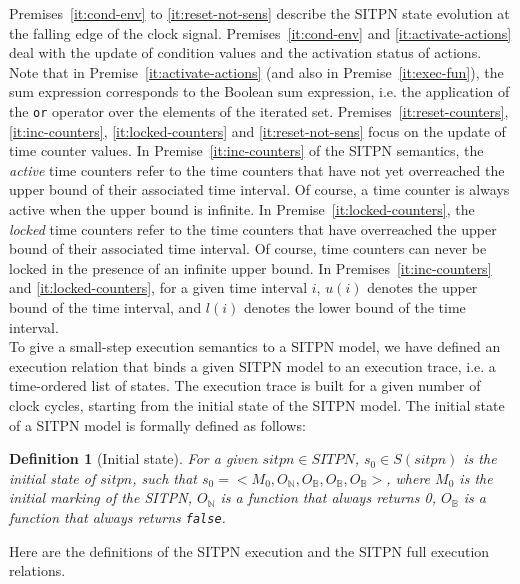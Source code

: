 \documentclass[pdflatex,sn-mathphys]{sn-jnl}%
\theoremstyle{thmstyleone}%
\theoremstyle{thmstyletwo}%
\theoremstyle{thmstylethree}%
\newtheorem{definition}{Definition}%
\begin{document}
Premises~\ref{it:cond-env} to \ref{it:reset-not-sens} describe the
SITPN state evolution at the falling edge of the clock
signal. Premises~\ref{it:cond-env} and \ref{it:activate-actions} deal
with the update of condition values and the activation status of
actions. Note that in Premise~\ref{it:activate-actions} (and also in
Premise~\ref{it:exec-fun}), the sum expression corresponds to the
Boolean sum expression, i.e. the application of the \texttt{or}
operator over the elements of the iterated
set. Premises~\ref{it:reset-counters}, \ref{it:inc-counters},
\ref{it:locked-counters} and \ref{it:reset-not-sens} focus on the
update of time counter values.  In Premise~\ref{it:inc-counters} of
the SITPN semantics, the \emph{active} time counters refer to the time
counters that have not yet overreached the upper bound of their
associated time interval. Of course, a time counter is always active
when the upper bound is infinite. In Premise~\ref{it:locked-counters},
the \emph{locked} time counters refer to the time counters that have
overreached the upper bound of their associated time interval. Of
course, time counters can never be locked in the presence of an
infinite upper bound. In Premises~\ref{it:inc-counters} and
\ref{it:locked-counters}, for a given time interval $i$, $u(i)$
denotes the upper bound of the time interval, and $l(i)$ denotes the
lower bound of the time interval.\\

To give a small-step execution semantics to a SITPN model, we have
defined an execution relation that binds a given SITPN model to an
execution trace, i.e. a time-ordered list of states. The execution
trace is built for a given number of clock cycles, starting from the
initial state of the SITPN model.  The initial state of a SITPN model
is formally defined as follows:

\begin{definition}[Initial state]
  \label{def:sitpn-init-state}
  For a given $sitpn\in{}SITPN$, $s_0\in{}S(sitpn)$ is the initial
  state of $sitpn$, such that
  $s_0=<M_0,O_\mathbb{N},O_\mathbb{B},O_\mathbb{B},O_\mathbb{B}>$,
  where $M_0$ is the initial marking of the SITPN, $O_\mathbb{N}$ is a
  function that always returns 0, $O_\mathbb{B}$ is a function that
  always returns \texttt{false}.
\end{definition}

Here are the definitions of the SITPN execution and the SITPN full
execution relations.
\end{document}
